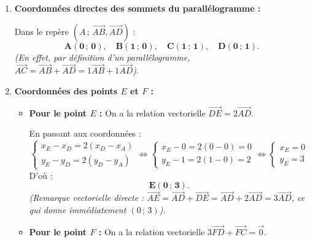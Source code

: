 \documentclass[11pt,a4paper]{article}
\newcommand{\vect}[1]{\overrightarrow{#1}}
\begin{document}
\begin{correctionbox}
\begin{enumerate}
    \item \textbf{Coordonnées directes des sommets du parallélogramme :}
    
    Dans le repère $(A\,;\, \vect{AB}, \vect{AD})$ :
    \[
    \mathbf{A(0\,;\,0)}, \quad \mathbf{B(1\,;\,0)}, \quad \mathbf{C(1\,;\,1)}, \quad \mathbf{D(0\,;\,1)}.
    \]
    \textit{(En effet, par définition d'un parallélogramme, $\vect{AC} = \vect{AB} + \vect{AD} = 1\vect{AB} + 1\vect{AD}$)}.

    \item \textbf{Coordonnées des points $E$ et $F$ :}
    
    \begin{itemize}[leftmargin=*,itemsep=3pt]
        \item \textbf{Pour le point $E$ :}
        On a la relation vectorielle $\vect{DE} = 2\vect{AD}$.
        
        En passant aux coordonnées :
        \[
        \begin{cases}
        x_E - x_D = 2(x_D - x_A) \\
        y_E - y_D = 2(y_D - y_A)
        \end{cases}
        \iff
        \begin{cases}
        x_E - 0 = 2(0 - 0) = 0 \\
        y_E - 1 = 2(1 - 0) = 2
        \end{cases}
        \iff
        \begin{cases}
        x_E = 0 \\
        y_E = 3
        \end{cases}
        \]
        D'où :
        \[
        \mathbf{E(0\,;\,3)}.
        \]
        \textit{(Remarque vectorielle directe : $\vect{AE} = \vect{AD} + \vect{DE} = \vect{AD} + 2\vect{AD} = 3\vect{AD}$, ce qui donne immédiatement $(0\,;\,3)$)}.

        \item \textbf{Pour le point $F$ :}
        On a la relation vectorielle $3\vect{FD} + \vect{FC} = \vect{0}$.
        

\end{itemize}
\end{enumerate}
\end{correctionbox}
\end{document}

